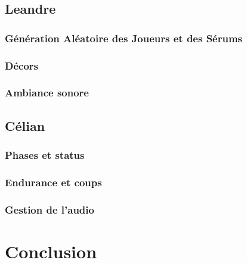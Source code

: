 \documentclass{article}
\begin{document}
\subsection{Leandre}

\subsubsection{Génération Aléatoire des Joueurs et des Sérums}

\subsubsection{Décors}

\subsubsection{Ambiance sonore}

\subsection{Célian}

\subsubsection{Phases et status}

\subsubsection{Endurance et coups}

\subsubsection{Gestion de l'audio}

\section{Conclusion}
\end{document}

